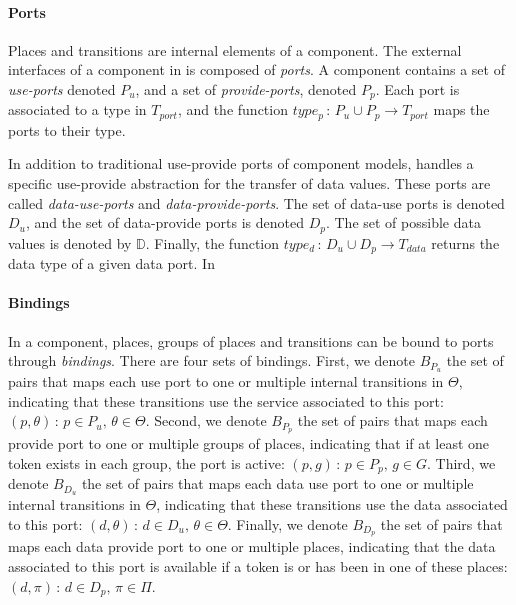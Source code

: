 \paragraph{Ports}{

Places and transitions are internal elements of a \mad component.
The external interfaces of a component in \mad is
composed of \emph{ports}. A component contains a set of \emph{use-ports}
denoted $P_{u}$, and a set of \emph{provide-ports}, denoted
$P_{p}$. Each port is associated to a type in $T_{port}$, and the
function $type_{p}\,:\,P_{u}\cup P_{p}\rightarrow T_{port}$ maps the ports
to their type. 

In addition to traditional use-provide ports of component models,
\mad handles a specific use-provide abstraction for the
transfer of data values. These ports are called \emph{data-use-ports}
and \emph{data-provide-ports}. The set of data-use ports is denoted
$D_{u}$, and the set of data-provide ports is denoted
$D_{p}$. The set of possible data values is denoted
by $\mathbb{D}$. Finally, the function $type_{d}\,:\,D_{u}\cup
D_{p}\rightarrow T_{data}$ returns the data type of a given data port. In
  
}

\paragraph{Bindings}{

In a \mad component, places, groups of places and transitions can be
bound to ports through \emph{bindings}. There are four sets of bindings.
First, we denote $B_{P_{u}}$ the set of pairs that maps
each use port to one or multiple internal transitions in $\Theta$, indicating
that these transitions use the service associated to this port: 
$\left(p,\theta\right)\,:\,p\in P_{u},\,\theta\in\Theta$. Second, we
denote $B_{P_{p}}$ the set of pairs that maps each provide port to one or
multiple groups of places, indicating that if at least one token exists in each
group, the port is active: $\left(p,g\right)\,:\,p\in
P_{p},\,g\in G$. Third, we denote $B_{D_{u}}$ the set of pairs that
maps each data use port to one or multiple internal transitions in $\Theta$,
indicating that these transitions use the data associated to this port: 
$\left(d,\theta\right)\,:\,d\in D_{u},\,\theta\in\Theta$. Finally, we
denote $B_{D_{p}}$ the set of pairs that maps each data provide port to
one or multiple places, indicating that the data associated to this port is
available if a token is or has been in one of these places: $\left(d,\pi\right)\,:\,d\in
D_{p},\,\pi\in \Pi$. 
}

